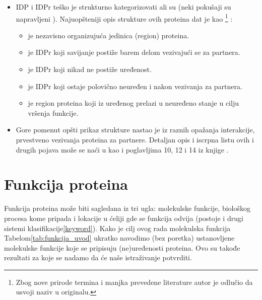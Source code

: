 \begin{itemize}
  \item 
    IDP i IDPr teško je strukturno kategorizovati \parencite{dunker2001,
      oldfield20014} ali su (neki pokušaji su napravljeni \parencite{dunker2001}).
      Najuopšteniji opis strukture ovih proteina dat je kao
      \footnote{ Zbog nove
        prirode termina i manjka prevedene literature autor je odlučio da
      usvoji naziv u originalu.} \parencite{uversky2016}:
    \begin{itemize}
      \item {}  je nezavisno organizujuća jedinica (region) proteina.
      \item {}  je IDPr koji savijanje postiže barem delom vezivajući se za partnera. 
      \item {}  je IDPr koji nikad ne postiže uređenost.
      \item {}  je IDPr koji ostaje polovično neuređen i nakon vezivanja za partnera.
      \item {}  je region proteina koji iz uređenog prelazi u neuređeno stanje u cilju vršenja funkcije.
    \end{itemize}

  \item 
    Gore pomenut opšti prikaz strukture nastao je iz raznih opažanja
    interakcije, prvestveno vezivanja proteina za partnere.
    Detaljan opis i iscrpna listu ovih i drugih pojava može se naći u 
    \parencite{a2z, uversky2016} kao i poglavljima 10, 12 i 14 iz knjige .

\end{itemize}

\section{Funkcija proteina}
Funkcija proteina može biti sagledana iz tri ugla: molekulske funkcije,
biološkog procesa kome pripada i lokacije u ćeliji gde se funkcija odvija
\parencite{go2000}(postoje i drugi sistemi klasifikacije\ref{keyword}).  Kako
je cilj ovog rada molekulska funkcija Tabelom\ref{tab:funkcija_uvod} ukratko
navodimo (bez poretka) ustanovljene \parencite{Xie2007} molekulske funkcije koje
se pripisuju (ne)uređenosti proteina. Ovo su takođe rezultati za koje se nadamo
da će naše istraživanje potvrditi.

